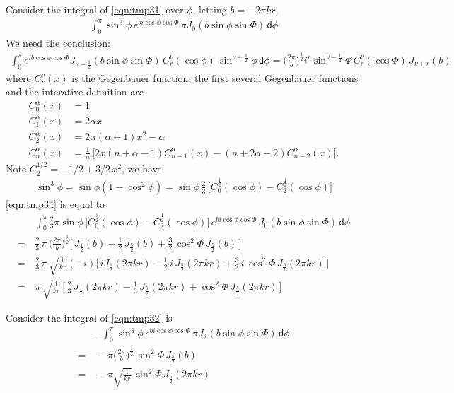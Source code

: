 \documentclass[aps,pre,preprint,unsortedaddress]{revtex4}
\renewcommand{\d}[1]{\textsf{#1}}
\begin{document}
Consider the integral of \eqref{eqn:tmp31} over $\phi$, letting $b = -2\pi kr$,
\begin{align}\label{eqn:tmp34}
  \int_0^\pi
  \sin^3\phi\, e^{bi\cos\phi\cos\Phi}\,\pi J_0(b\sin\phi\sin\Phi)\,
  \d d\phi
\end{align}
We need the conclusion:
\begin{align}
  \int_0^\pi
  e^{ib\cos\phi\cos\Phi}
  J_{\nu-\frac12}(b\sin\phi\sin\Phi)\,
  C_r^\nu(\cos\phi)\,
  \sin^{\nu + \frac12}\phi
  \,\d d\phi
  =
  \Big(\frac{2\pi}{b}\Big)^{\frac12}
  i^r
  \sin^{\nu - \frac12}\Phi\,
  C_r^\nu(\cos\Phi)\,
  J_{\nu + r}(b)
\end{align}
where $C_r^\nu(x)$ is the Gegenbauer function, the first several
Gegenbauer functions and the interative definition are
\begin{align}
  C_0^\alpha (x) &= 1 \\
  C_1^\alpha(x) &= 2\alpha x\\
  C_2^\alpha(x) &= 2\alpha(\alpha + 1) x^2 - \alpha\\
  C_n^\alpha(x) & = \frac{1}{n}\,\Big[
  2x(n+\alpha-1)C_{n-1}^\alpha(x) - (n+2\alpha-2)C_{n-2}^\alpha(x)
  \Big].
\end{align}
Note $C_2^{1/2} = -1/2 + 3/2\,x^2$, we have
\begin{align}
  \sin^3\phi = \sin\phi(1-\cos^2\phi)=
  \sin\phi\,\frac23\,\Big[
  C_0^{\frac12}(\cos\phi) - C_2^{\frac12}(\cos\phi)
  \Big]
\end{align}
\eqref{eqn:tmp34} is equal to
\begin{align}\nonumber
  &\int_0^\pi
  \frac23\pi\sin\phi\,
  \Big[
  C_0^{\frac12}(\cos\phi) - C_2^{\frac12}(\cos\phi)
  \Big]
  \, e^{bi\cos\phi\cos\Phi}\, J_0(b\sin\phi\sin\Phi)\,
  \d d\phi   \\ \nonumber
  = \,&
  \frac23\, \pi\,
  \Big( \frac{2\pi}b \Big )^{\frac12}
  \Big[\,
  J_{\frac12}(b) - \frac12\,J_{\frac52}(b) +
  \frac32\,\cos^2\Phi\, J_{\frac52}(b)
  \,\Big] \\ \nonumber
  = \,&
  \frac23\, \pi\,
  \sqrt{ \frac1{kr} }(-i)
  \Big[\,
  iJ_{\frac12}(2\pi kr) -  \frac12\,i\,J_{\frac52}(2\pi kr) +
  \frac32\,i\,\cos^2\Phi\, J_{\frac52}(2\pi kr)
  \,\Big] \\
  = \,&
  \pi\,
  \sqrt{ \frac1{kr} }\,
  \Big[\,
  \frac23\,J_{\frac12}(2\pi kr) -  \frac13\,J_{\frac52}(2\pi kr) +
  \cos^2\Phi\, J_{\frac52}(2\pi kr)
  \,\Big] 
\end{align}

Consider the integral of \eqref{eqn:tmp32} is
\begin{align}\nonumber
  &-\int_0^\pi
  \sin^3\phi\, e^{bi\cos\phi\cos\Phi}\,\pi J_2(b\sin\phi\sin\Phi)\,
  \d d\phi \\ \nonumber
  = &\, 
  -\pi \Big( \frac{2\pi}b \Big )^{\frac12}\,
  \sin^2\Phi\,
  J_{\frac52}(b) \\
  = &\, 
  -\pi \sqrt{ \frac1{kr} }\,
  \sin^2\Phi\,
  J_{\frac52}(2\pi kr) 
\end{align}
\end{document}
